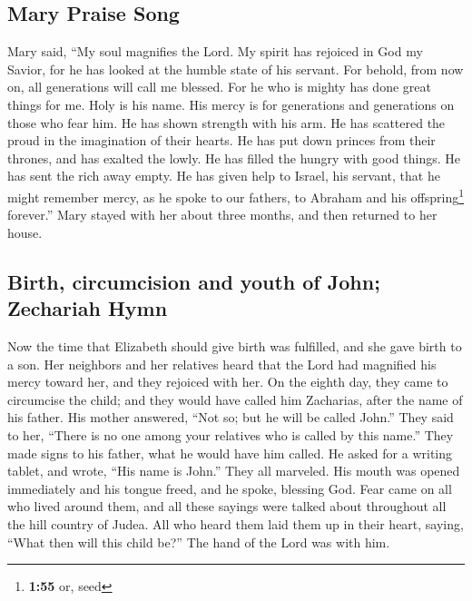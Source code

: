 \begin{paracol}{2}
\begin{otherlanguage}{english}
\hypertarget{mary-praise-song}{%
\subsection{Mary Praise Song}\label{mary-praise-song}}

 Mary said, ``My soul magnifies the Lord. 
My spirit has rejoiced in God my Savior,  for he has
looked at the humble state of his servant. For behold, from now on, all
generations will call me blessed.  For he who is mighty
has done great things for me. Holy is his name.  His
mercy is for generations and generations on those who fear him.
 He has shown strength with his arm. He has scattered the
proud in the imagination of their hearts.  He has put
down princes from their thrones, and has exalted the lowly.
 He has filled the hungry with good things. He has sent
the rich away empty.  He has given help to Israel, his
servant, that he might remember mercy,  as he spoke to
our fathers, to Abraham and his offspring\footnote{\textbf{1:55} or,
  seed} forever.''  Mary stayed with her about three
months, and then returned to her house.

\hypertarget{birth-circumcision-and-youth-of-john-zechariah-hymn}{%
\subsection{Birth, circumcision and youth of John; Zechariah
Hymn}\label{birth-circumcision-and-youth-of-john-zechariah-hymn}}

 Now the time that Elizabeth should give birth was
fulfilled, and she gave birth to a son.  Her neighbors
and her relatives heard that the Lord had magnified his mercy toward
her, and they rejoiced with her.  On the eighth day, they
came to circumcise the child; and they would have called him Zacharias,
after the name of his father.  His mother answered, ``Not
so; but he will be called John.''  They said to her,
``There is no one among your relatives who is called by this name.''
 They made signs to his father, what he would have him
called.  He asked for a writing tablet, and wrote, ``His
name is John.'' They all marveled.  His mouth was opened
immediately and his tongue freed, and he spoke, blessing God.
 Fear came on all who lived around them, and all these
sayings were talked about throughout all the hill country of Judea.
 All who heard them laid them up in their heart, saying,
``What then will this child be?'' The hand of the Lord was with him.


\end{otherlanguage}
\end{paracol}
